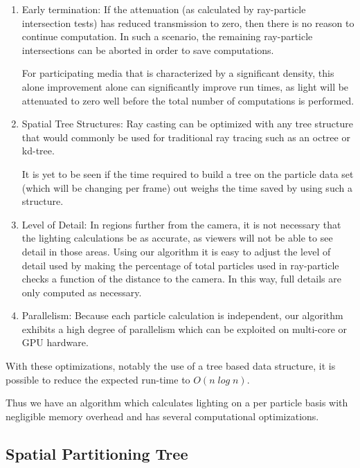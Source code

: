 \documentclass{article}
\begin{document}
\begin{enumerate}

  \item Early termination: If the attenuation (as calculated by ray-particle intersection tests) has reduced transmission to zero, then there is no reason to continue computation. In such a scenario, the remaining ray-particle intersections can be aborted in order to save computations.

For participating media that is characterized by a significant density, this alone improvement alone can significantly improve run times, as light will be attenuated to zero well before the total number of computations is performed.

  \item Spatial Tree Structures: Ray casting can be optimized with any tree structure that would commonly be used for traditional ray tracing such as an octree or kd-tree.

It is yet to be seen if the time required to build a tree on the particle data set (which will be changing per frame) out weighs the time saved by using such a structure.

\item Level of Detail: In regions further from the camera, it is not necessary that the lighting calculations be as accurate, as viewers will not be able to see detail in those areas. Using our algorithm it is easy to adjust the level of detail used by making the percentage of total particles used in ray-particle checks a function of the distance to the camera. In this way, full details are only computed as necessary.

\item Parallelism: Because each particle calculation is independent, our algorithm exhibits a high degree of parallelism which can be exploited on multi-core or GPU hardware.

\end{enumerate}

With these optimizations, notably the use of a tree based data structure, it is possible to reduce the expected run-time to $O(n\;log\;n)$.

Thus we have an algorithm which calculates lighting on a per particle basis with negligible memory overhead and has several computational optimizations.

\subsection{Spatial Partitioning Tree}
\end{document}
